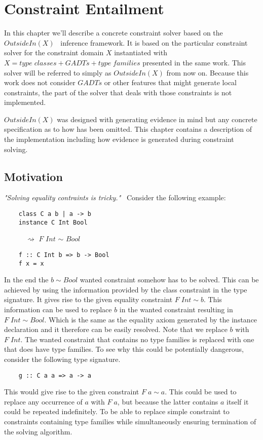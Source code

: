 \chapter{Constraint Entailment}
\label{cha:entailment}
In this chapter we'll describe a concrete constraint solver based on the
$OutsideIn(X)$~\cite{outsideinx-modular-type-inference-with-local-assumptions}
inference framework. It is based on the particular constraint solver for the
constraint domain $X$ instantiated with $X = type \; classes + GADTs + type \;
families$ presented in the same work. This solver will be referred to simply as
$OutsideIn(X)$ from now on. Because this work does not consider $GADTs$ or other
features that might generate local constraints, the part of the solver that
deals with those constraints is not implemented.

$OutsideIn(X)$ was designed with generating evidence in mind but any concrete
specification as to how has been omitted. This chapter contains a description of
the implementation including how evidence is generated during constraint
solving.

\section{Motivation}
\textit{"Solving equality contraints is
tricky."}~\cite{outsideinx-modular-type-inference-with-local-assumptions}
Consider the following example:
\begin{verbatim}
    class C a b | a -> b
    instance C Int Bool
\end{verbatim}
$\quad\quad\quad\rightsquigarrow$ $F$ $Int$ $\sim$ $Bool$
\begin{verbatim}
    f :: C Int b => b -> Bool
    f x = x
\end{verbatim}

In the end the $b \sim Bool$ wanted constraint somehow has to be solved. This
can be achieved by using the information provided by the class constraint in the
type signature. It gives rise to the given equality constraint $F \; Int \sim
b$. This information can be used to replace $b$ in the wanted constraint
resulting in $F \; Int \sim Bool$. Which is the same as the equality axiom
generated by the instance declaration and it therefore can be easily resolved.
Note that we replace $b$ with $F \; Int$. The wanted constraint that contains no
type families is replaced with one that does have type families. To see why this
could be potentially dangerous, consider the following type signature.
\begin{verbatim}
    g :: C a a => a -> a
\end{verbatim}
This would give rise to the given constraint $F \; a \sim a$. This could be used
to replace any occurrence of $a$ with $F \; a$, but because the latter contains
$a$ itself it could be repeated indefinitely. To be able to replace simple
constraint to constraints containing type families while simultaneously ensuring
termination of the solving algorithm.

